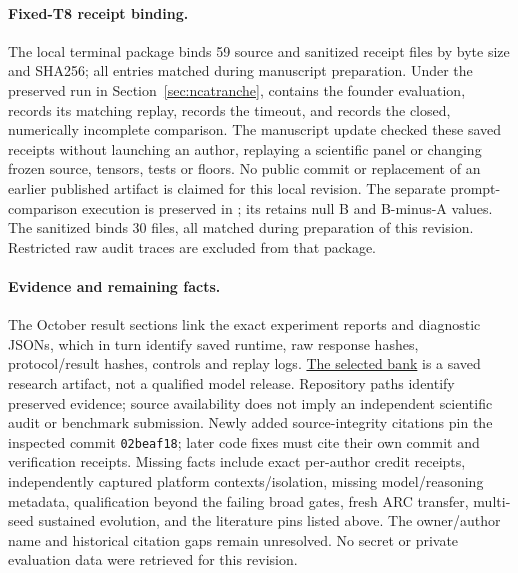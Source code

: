 \documentclass[11pt]{article}
\begin{document}
\paragraph{Fixed-T8 receipt binding.}
The local terminal package
binds 59 source and sanitized receipt files by byte size and SHA256; all entries
matched during manuscript preparation. Under the preserved run in
Section~\ref{sec:ncatranche},  contains the
founder evaluation,  records its
matching replay,  records the timeout,
and  records the closed, numerically incomplete comparison.
The manuscript update checked these saved receipts without launching an author,
replaying a scientific panel or changing frozen source, tensors, tests or floors.
No public commit or replacement of an earlier published artifact is claimed for
this local revision. The separate prompt-comparison execution is preserved in
; its
 retains null B and B-minus-A values. The sanitized
binds 30 files, all matched during preparation of this revision. Restricted raw
audit traces are excluded from that package.

\paragraph{Evidence and remaining facts.}
The October result sections link the exact experiment reports and diagnostic JSONs, which in
turn identify saved runtime, raw response hashes, protocol/result hashes, controls and replay
logs. \href{https://github.com/Sanokei/CellForge/blob/02beaf18251fca5ed1f1eb55e92f00a3e3820e88/runs/weights-native-composition01-20261006/SELECTED_SKILL_BANK.json}{The selected bank}
is a saved research artifact, not a qualified model release. Repository paths identify
preserved evidence; source availability does not imply an independent scientific audit or
benchmark submission. Newly added source-integrity citations pin the inspected commit
\texttt{02beaf18}; later code fixes must cite their own commit and verification receipts. Missing facts include
exact per-author credit receipts, independently captured platform contexts/isolation, missing
model/reasoning metadata, qualification beyond the failing broad gates, fresh ARC transfer,
multi-seed sustained evolution, and the literature pins listed above. The owner/author name and
historical citation gaps remain unresolved. No secret or private evaluation data were retrieved
for this revision.
\end{document}
